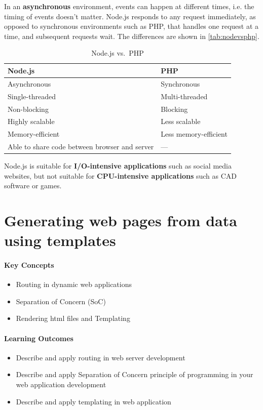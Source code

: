 In an \textbf{asynchronous} environment, events can happen at different times, i.e. the timing of events doesn't matter. Node.js responds to any request immediately, as opposed to synchronous environments such as PHP, that handles one request at a time, and subsequent requests wait. The differences are shown in \autoref{tab:nodevsphp}.


\begin{table}[ht]
    \centering
    \begin{tabular}{@{}ll@{}}
    \toprule
    \textbf{Node.js} & \textbf{PHP} \\ \midrule
    Asynchronous & Synchronous \\
    Single-threaded & Multi-threaded \\
    Non-blocking & Blocking \\
    Highly scalable & Less scalable \\
    Memory-efficient & Less memory-efficient \\
    Able to share code between browser and server & --- \\ \bottomrule
    \end{tabular}
    \caption{Node.js vs.\ PHP}
    \label{tab:nodevsphp}
    \end{table}

Node.js is suitable for \textbf{I/O-intensive applications} such as social media websites, but not suitable for \textbf{CPU-intensive applications} such as CAD software or games. 



\section{Generating web pages from data using templates}

\begin{mdframed}

\paragraph{Key Concepts}
\begin{itemize}[label={\checkmark}]
\item Routing in dynamic web applications
\item Separation of Concern (SoC)
\item Rendering html files and Templating
\end{itemize}

\paragraph{Learning Outcomes}
\begin{itemize}[label={\checkmark}]
\item Describe and apply routing in web server development
\item Describe and apply Separation of Concern principle of programming in your web application development
\item Describe and apply templating in web application
\end{itemize}


\end{mdframed}

